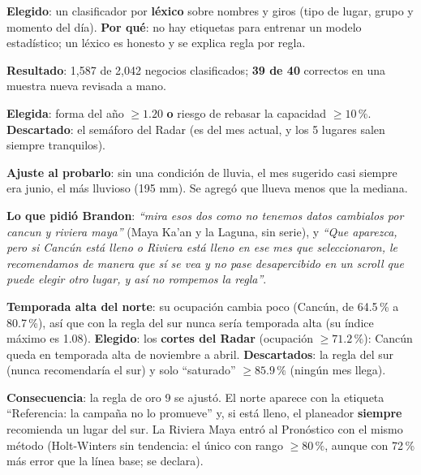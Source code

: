 \begin{opciones}
\textbf{Elegido}: un clasificador por \textbf{léxico} sobre nombres y giros (tipo de lugar, grupo y momento del día).
\textbf{Por qué}: no hay etiquetas para entrenar un modelo estadístico; un léxico es honesto y se explica regla por regla.

\textbf{Resultado}: 1,587 de 2,042 negocios clasificados; \textbf{39 de 40} correctos en una muestra nueva revisada a mano.
\end{opciones}

\begin{opciones}
\textbf{Elegida}: forma del año $\geq1.20$ \textbf{o} riesgo de rebasar la capacidad $\geq10\,\%$. \textbf{Descartado}: el
semáforo del Radar (es del mes actual, y los 5 lugares salen siempre tranquilos).

\textbf{Ajuste al probarlo}: sin una condición de lluvia, el mes sugerido casi siempre era junio, el más lluvioso (195 mm). Se
agregó que llueva menos que la mediana.
\end{opciones}

\begin{opciones}
\textbf{Lo que pidió Brandon}: \emph{``mira esos dos como no tenemos datos cambialos por cancun y riviera maya''} (Maya Ka'an y
la Laguna, sin serie), y \emph{``Que aparezca, pero si Cancún está lleno o Riviera está lleno en ese mes que seleccionaron, le
recomendamos de manera que sí se vea y no pase desapercibido en un scroll que puede elegir otro lugar, y así no rompemos la
regla''}.

\textbf{Temporada alta del norte}: su ocupación cambia poco (Cancún, de 64.5\,\% a 80.7\,\%), así que con la regla del sur nunca
sería temporada alta (su índice máximo es 1.08). \textbf{Elegido}: los \textbf{cortes del Radar} (ocupación $\geq71.2\,\%$):
Cancún queda en temporada alta de noviembre a abril. \textbf{Descartados}: la regla del sur (nunca recomendaría el sur) y solo
``saturado'' $\geq85.9\,\%$ (ningún mes llega).

\textbf{Consecuencia}: la regla de oro 9 se ajustó. El norte aparece con la etiqueta ``Referencia: la campaña no lo
promueve'' y, si está lleno, el planeador \textbf{siempre} recomienda un lugar del sur. La Riviera Maya entró al Pronóstico con
el mismo método (Holt-Winters sin tendencia: el único con rango $\geq80\,\%$, aunque con 72\,\% más error que la línea base; se
declara).
\end{opciones}
